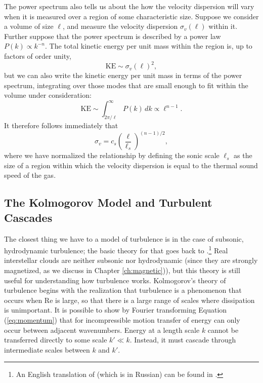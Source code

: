 The power spectrum also tells us about the how the velocity dispersion will vary when it is measured over a region of some characteristic size. Suppose we consider a volume of size $\ell$, and measure the velocity dispersion $\sigma_v(\ell)$ within it. Further suppose that the power spectrum is described by a power law $P(k)\propto k^{-n}$. The total kinetic energy per unit mass within the region is, up to factors of order unity,
\begin{equation}
\mathrm{KE} \sim \sigma_v(\ell)^2,
\end{equation}
but we can also write the kinetic energy per unit mass in terms of the power spectrum, integrating over those modes that are small enough to fit within the volume under consideration:
\begin{equation}
\mathrm{KE} \sim \int_{2\pi/\ell}^\infty P(k) \, dk \propto \ell^{n-1}.
\end{equation}
It therefore follows immediately that
\begin{equation}
\label{eq:vdisp}
\sigma_v = c_s \left(\frac{\ell}{\ell_s}\right)^{(n-1)/2},
\end{equation}
where we have normalized the relationship by defining the sonic scale $\ell_s$ as the size of a region within which the velocity dispersion is equal to the thermal sound speed of the gas.

\subsection{The Kolmogorov Model and Turbulent Cascades}

The closest thing we have to a model of turbulence is in the case of subsonic, hydrodynamic turbulence; the basic theory for that goes back to \citet{kolmogorov41a}.\footnote{An English translation of \citet{kolmogorov41a} (which is in Russian) can be found in \citet{kolmogorov91a}.} Real interstellar clouds are neither subsonic nor hydrodynamic (since they are strongly magnetized, as we discuss in Chapter \ref{ch:magnetic})), but this theory is still useful for understanding how turbulence works. Kolmogorov's theory of turbulence begins with the realization that turbulence is a phenomenon that occurs when Re is large, so that there is a large range of scales where dissipation is unimportant. It is possible to show by Fourier transforming Equation (\ref{eq:momentum}) that for incompressible motion transfer of energy can only occur between adjacent wavenumbers. Energy at a length scale $k$ cannot be transferred directly to some scale $k' \ll k$. Instead, it must cascade through intermediate scales between $k$ and $k'$.


